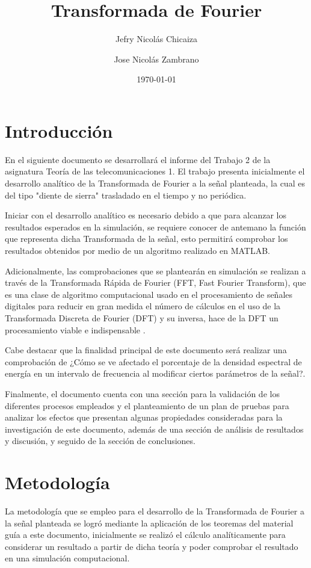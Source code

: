 \documentclass[11pt,letterpaper,twocolumn]{article}
\date{\today}
\title{
    \fontsize{26}{26}\selectfont 
    \textbf{Transformada de Fourier}}
\author[1]{Jefry Nicolás Chicaiza}
\author[2]{Jose Nicolás Zambrano}
\affil[1]{\url{jefryn@unicauca.edu.co}}
\affil[2]{\url{jnzambranob@unicauca.edu.co}}
\date{}
\begin{document}
\maketitle
\thispagestyle{fancy}
\section{Introducción}\label{intro}
    En el siguiente documento se desarrollará el informe del Trabajo 2 de la asignatura 
    Teoría de las telecomunicaciones 1. El trabajo presenta inicialmente el desarrollo 
    analítico de la Transformada de Fourier a la señal planteada, la cual es del tipo 
    "diente de sierra"  trasladado en el tiempo y no periódica.
    
    Iniciar con el desarrollo analítico es necesario debido a que para alcanzar los 
    resultados esperados en la simulación, se requiere conocer de antemano la función que 
    representa dicha Transformada de la señal, esto permitirá comprobar los resultados 
    obtenidos por medio de un algoritmo realizado en MATLAB.
    
    Adicionalmente, las comprobaciones que se plantearán en simulación se realizan a través 
    de la Transformada Rápida de Fourier (FFT, Fast Fourier Transform), que es una clase de 
    algoritmo computacional usado en el procesamiento de señales digitales para reducir en gran 
    medida el número de cálculos en el uso de la Transformada Discreta de Fourier (DFT) y su 
    inversa, hace de la DFT un procesamiento viable e indispensable \cite{Poularikas2007}.
    
    Cabe destacar que la finalidad principal de este documento será realizar una comprobación de 
    ¿Cómo se ve afectado el porcentaje de la densidad espectral de energía en un intervalo de 
    frecuencia al modificar ciertos parámetros de la señal?.
    
    Finalmente, el documento cuenta 
    con una sección para la validación de los diferentes procesos empleados y el planteamiento 
    de un plan de pruebas para analizar los efectos que presentan algunas propiedades 
    consideradas para la investigación de este documento, además de una sección de análisis de 
    resultados y discusión, y seguido de la sección de conclusiones.

       
\section{Metodología}
    La metodología que se empleo para el desarrollo de la Transformada de Fourier a la señal planteada 
    se logró mediante la aplicación de los teoremas del material guía a este documento, inicialmente
    se realizó el cálculo analíticamente para considerar un resultado a partir de dicha teoría y
    poder comprobar el resultado en una simulación computacional. 
    
\end{document}
